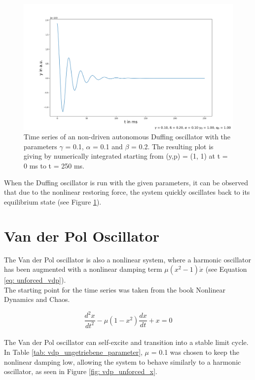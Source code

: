 \documentclass[oneside,10pt,a4paper]{report}
\begin{document}
		
		\begin{figure}[H]
			\centering
			\includegraphics[scale=0.4]{duffing_unforced_y.png}
			\caption{Time series of an non-driven autonomous Duffing oscillator with the parameters $\gamma$ = 0.1, $\alpha$ = 0.1 and $\beta$ = 0.2. The resulting plot is giving by numerically integrated starting from (y,p) = (1, 1) at t = 0 ms to t = 250 ms.}
			\label{fig: duffing_unforced_y}
		\end{figure}
		
		When the Duffing oscillator is run with the given parameters, it can be observed that due to the nonlinear restoring force, the system quickly oscillates back to its equilibrium state (see Figure \ref{fig: duffing_unforced_y}).
	
	
		\section{Van der Pol Oscillator}
		The Van der Pol oscillator is also a nonlinear system, where a harmonic oscillator has been augmented with a nonlinear damping term $\mu(x^2 - 1)\dot{x}$ (see Equation \ref{eq: unforced_vdp}).\\
		The starting point for the time series was taken from the book Nonlinear Dynamics and Chaos\cite{Nonlinear_Dynamic_and_chaos_book}.
		
		\begin{equation}\label{eq: unforced_vdp}
			\frac{d^2x}{dt^2} - \mu (1 - x^2) \frac{dx}{dt} + x = 0
		\end{equation}
		\\
		The Van der Pol oscillator can self-excite and transition into a stable limit cycle. In Table \ref{tab: vdp_ungetriebene_parameter}, $\mu$ = 0.1 was chosen to keep the nonlinear damping low, allowing the system to behave similarly to a harmonic oscillator, as seen in Figure \ref{fig: vdp_unforced_x}.
		
\end{document}
